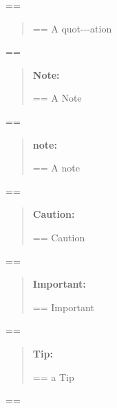 \documentclass{book}
\makeatletter
\newenvironment{Texinfopreformatted}{%
  \par\GNUTobeylines\obeyspaces\frenchspacing\parskip=\z@\parindent=\z@}{}
{\catcode`\^^M=13 \gdef\GNUTobeylines{\catcode`\^^M=13 \def^^M{\null\par}}}
\newenvironment{Texinfoindented}{\begin{list}{}{}\item\relax}{\end{list}}
\renewcommand{\_}{\Texinfounderscore\discretionary{}{}{}}
\makeatother
\begin{document}
\begin{Texinfoindented}
\begin{Texinfoindented}
\end{Texinfoindented}
\begin{Texinfopreformatted}%
\ttfamily 
\end{Texinfopreformatted}
\begin{quote}
\begin{Texinfopreformatted}%
\ttfamily A quot{-}{-}{-}ation
\end{Texinfopreformatted}
\end{quote}
\begin{Texinfopreformatted}%
\ttfamily 
\end{Texinfopreformatted}
\begin{quote}
\textbf{Note:} \begin{Texinfopreformatted}%
\ttfamily A Note
\end{Texinfopreformatted}
\end{quote}
\begin{Texinfopreformatted}%
\ttfamily 
\end{Texinfopreformatted}
\begin{quote}
\textbf{note:} \begin{Texinfopreformatted}%
\ttfamily A note
\end{Texinfopreformatted}
\end{quote}
\begin{Texinfopreformatted}%
\ttfamily 
\end{Texinfopreformatted}
\begin{quote}
\textbf{Caution:} \begin{Texinfopreformatted}%
\ttfamily Caution
\end{Texinfopreformatted}
\end{quote}
\begin{Texinfopreformatted}%
\ttfamily 
\end{Texinfopreformatted}
\begin{quote}
\textbf{Important:} \begin{Texinfopreformatted}%
\ttfamily Important
\end{Texinfopreformatted}
\end{quote}
\begin{Texinfopreformatted}%
\ttfamily 
\end{Texinfopreformatted}
\begin{quote}
\textbf{Tip:} \begin{Texinfopreformatted}%
\ttfamily a Tip
\end{Texinfopreformatted}
\end{quote}
\begin{Texinfopreformatted}%

\end{Texinfopreformatted}
\end{Texinfoindented}
\end{document}
